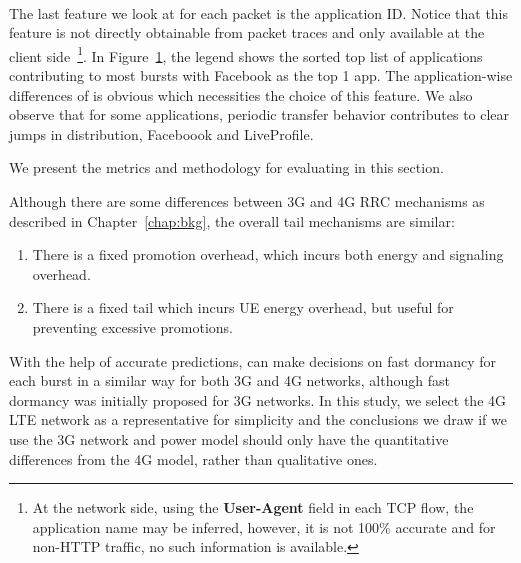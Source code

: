 \begin{figure}[h]
\centering
{} \\
\label{fig:appid1}
\end{figure}
The last feature we look at for each packet is the application ID. Notice that this feature is not directly obtainable from packet traces and only available at the client side~\footnote{At the network side, using the \textbf{User-Agent} field in each TCP flow, the application name may be inferred, however, it is not 100\% accurate and for non-HTTP traffic, no such information is available.}. In Figure~\ref{fig:appid1}, the legend shows the sorted top list of applications contributing to most bursts with Facebook as the top 1 app. The application-wise differences of \IBT is obvious which necessities the choice of this feature. We also observe that for some applications, periodic transfer behavior contributes to clear jumps in \IBT distribution, \eg Faceboook and LiveProfile.

\label{sec:method}

We present the metrics and methodology for evaluating \NAME in this section.



Although there are some differences between 3G and 4G RRC mechanisms as described in Chapter~\ref{chap:bkg}, the overall tail mechanisms are similar:

\begin{enumerate}
\item There is a fixed promotion overhead, which incurs both energy and signaling overhead.
\item There is a fixed tail which incurs UE energy overhead, but useful for preventing excessive promotions.
\end{enumerate}

With the help of accurate \IBT predictions, \NAME can make decisions on fast dormancy for each burst in a similar way for both 3G and 4G networks, although fast dormancy was initially proposed for 3G networks. In this study, we select the 4G LTE network as a representative for simplicity and the conclusions we draw if we use the 3G network and power model should only have the quantitative differences from the 4G model, rather than qualitative ones.


